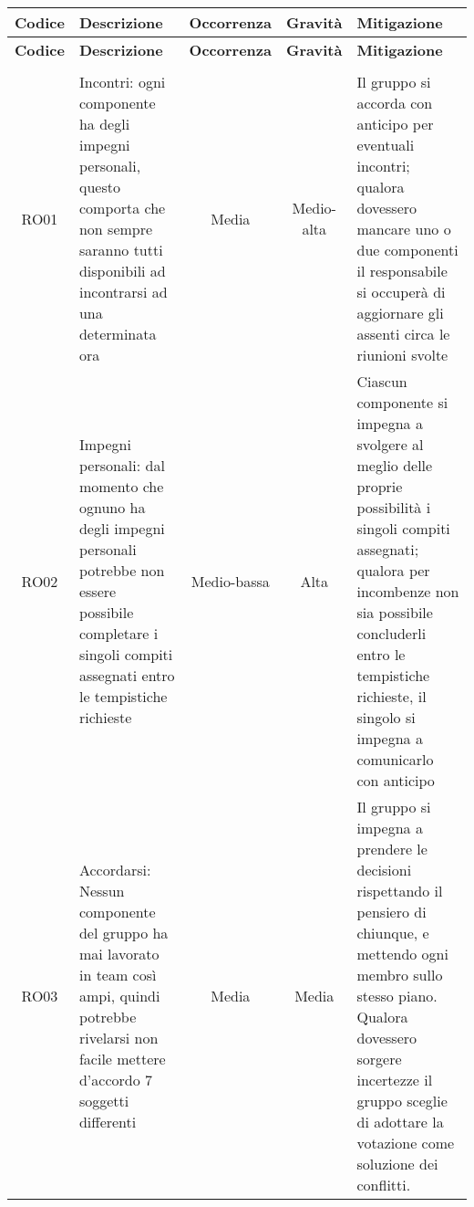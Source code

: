 \documentclass[../piano_di_progetto.tex]{subfiles}
\begin{document}
\begin{center}
	\begin{longtable}{|c|p{4.5cm}|c|c|p{4.5cm}|}
		\hline
		\rowcolor{lightgray}
		{\textbf{Codice}} & {\textbf{Descrizione}} & {\textbf{Occorrenza}} & {\textbf{Gravità}} & {\textbf{Mitigazione}}\\
		\hline

		\endfirsthead
	
		\hline
		\rowcolor{lightgray}
		{\textbf{Codice}} & {\textbf{Descrizione}} & {\textbf{Occorrenza}} & {\textbf{Gravità}} & {\textbf{Mitigazione}}\\
		\hline
		\endhead
		
		\hline
		\rowcolor{white}
		\multicolumn{5}{|c|}{\emph{Continua alla pagina successiva...}}\\
		\hline
		\endfoot

		\endlastfoot

		RO01              &
		Incontri: ogni componente ha degli impegni personali, questo comporta che non sempre saranno tutti disponibili ad incontrarsi ad una determinata ora
		                  &
		Media
		                  &
		Medio-alta
		                  &
		Il gruppo si accorda con anticipo per eventuali incontri; qualora dovessero mancare uno o due componenti il responsabile si occuperà di aggiornare gli assenti circa le riunioni svolte                                                         \\
		
		RO02              &
		Impegni personali: dal momento che ognuno ha degli impegni personali potrebbe non essere possibile completare i singoli compiti assegnati entro le tempistiche richieste
		                  &
		Medio-bassa
		                  &
		Alta
		                  &
		Ciascun componente si impegna a svolgere al meglio delle proprie possibilità i singoli compiti assegnati; qualora per incombenze non sia possibile concluderli entro le tempistiche richieste, il singolo si impegna a comunicarlo con anticipo \\
		
		RO03              &
		Accordarsi: Nessun componente del gruppo ha mai lavorato in team così ampi, quindi potrebbe rivelarsi non facile mettere d’accordo 7 soggetti differenti
		                  &
		Media
		                  &
		Media
		                  &
		Il gruppo si impegna a prendere le decisioni rispettando il pensiero di chiunque, e mettendo ogni membro sullo stesso piano. Qualora dovessero sorgere incertezze il gruppo sceglie di adottare la votazione come soluzione dei conflitti.      \\
		

\end{longtable}
\end{center}
\end{document}
